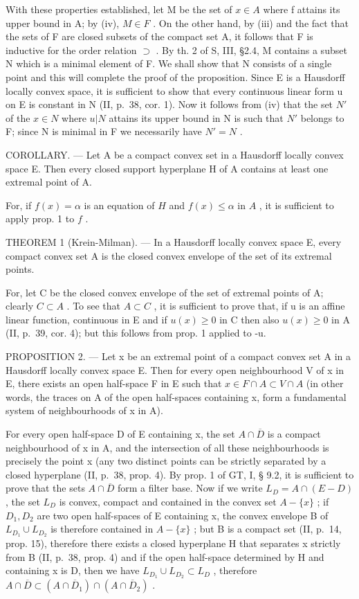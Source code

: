 With these properties established, let M be the set of \(x \in A\) where f attains its upper bound in A; by (iv), \(M \in F\) . On the other hand, by (iii) and the fact that the sets of F are closed subsets of the compact set A, it follows that F is inductive for the order relation \(\supset\) . By th. 2 of S, III, §2.4, M contains a subset N which is a minimal element of F. We shall show that N consists of a single point and this will complete the proof of the proposition. Since E is a Hausdorff locally convex space, it is sufficient to show that every continuous linear form u on E is constant in N (II, p.~38, cor. 1). Now it follows from (iv) that the set \(N'\) of the \(x \in N\) where \(u|N\) attains its upper bound in N is such that \(N'\) belongs to F; since N is minimal in F we necessarily have \(N' = N\) .

COROLLARY. --- Let A be a compact convex set in a Hausdorff locally convex space E. Then every closed support hyperplane H of A contains at least one extremal point of A.

For, if \(f(x) = \alpha\) is an equation of \(H\) and \(f(x) \leqslant \alpha\) in \(A\) , it is sufficient to apply prop. 1 to \(f\) .

THEOREM 1 (Krein-Milman). --- In a Hausdorff locally convex space E, every compact convex set A is the closed convex envelope of the set of its extremal points.

For, let C be the closed convex envelope of the set of extremal points of A; clearly \(C \subset A\) . To see that \(A \subset C\) , it is sufficient to prove that, if u is an affine linear function, continuous in E and if \(u(x) \geqslant 0\) in C then also \(u(x) \geqslant 0\) in A (II, p.~39, cor. 4); but this follows from prop. 1 applied to -u.

PROPOSITION 2. --- Let x be an extremal point of a compact convex set A in a Hausdorff locally convex space E. Then for every open neighbourhood V of x in E, there exists an open half-space F in E such that \(x \in F \cap A \subset V \cap A\) (in other words, the traces on A of the open half-spaces containing x, form a fundamental system of neighbourhoods of x in A).

For every open half-space D of E containing x, the set \(A \cap \overline{D}\) is a compact neighbourhood of x in A, and the intersection of all these neighbourhoods is precisely the point x (any two distinct points can be strictly separated by a closed hyperplane (II, p.~38, prop. 4). By prop. 1 of GT, I, § 9.2, it is sufficient to prove that the sets \(A \cap \overline{D}\) form a filter base. Now if we write \(L_{D} = A \cap (E - D)\) , the set \(L_{D}\) is convex, compact and contained in the convex set \(A - \{x\}\) ; if \(D_{1}, D_{2}\) are two open half-spaces of E containing x, the convex envelope B of \(L_{D_{1}} \cup L_{D_{2}}\) is therefore contained in \(A - \{x\}\) ; but B is a compact set (II, p.~14, prop. 15), therefore there exists a closed hyperplane H that separates x strictly from B (II, p.~38, prop. 4) and if the open half-space determined by H and containing x is D, then we have \(L_{D_{1}} \cup L_{D_{2}} \subset L_{D}\) , therefore \(A \cap \overline{D} \subset (A \cap \overline{D}_{1}) \cap (A \cap \overline{D}_{2})\) .


